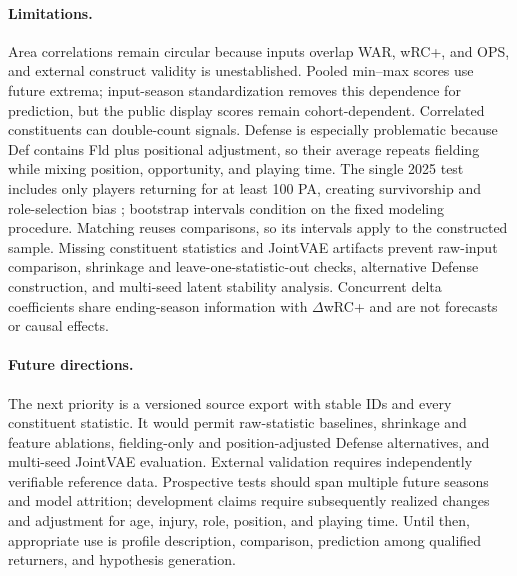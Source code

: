 \documentclass[10pt,twocolumn,letterpaper]{article}
\begin{document}
\paragraph{Limitations.}
Area correlations remain circular because inputs overlap WAR, wRC+, and OPS, and external construct validity is unestablished. Pooled min--max scores use future extrema; input-season standardization removes this dependence for prediction, but the public display scores remain cohort-dependent. Correlated constituents can double-count signals. Defense is especially problematic because Def contains Fld plus positional adjustment, so their average repeats fielding while mixing position, opportunity, and playing time. The single 2025 test includes only players returning for at least 100 PA, creating survivorship and role-selection bias \cite{nguyen2024}; bootstrap intervals condition on the fixed modeling procedure. Matching reuses comparisons, so its intervals apply to the constructed sample. Missing constituent statistics and JointVAE artifacts prevent raw-input comparison, shrinkage and leave-one-statistic-out checks, alternative Defense construction, and multi-seed latent stability analysis. Concurrent delta coefficients share ending-season information with $\Delta$wRC+ and are not forecasts or causal effects.

\paragraph{Future directions.}
The next priority is a versioned source export with stable IDs and every constituent statistic. It would permit raw-statistic baselines, shrinkage and feature ablations, fielding-only and position-adjusted Defense alternatives, and multi-seed JointVAE evaluation. External validation requires independently verifiable reference data. Prospective tests should span multiple future seasons and model attrition; development claims require subsequently realized changes and adjustment for age, injury, role, position, and playing time. Until then, appropriate use is profile description, comparison, prediction among qualified returners, and hypothesis generation.



\end{document}
